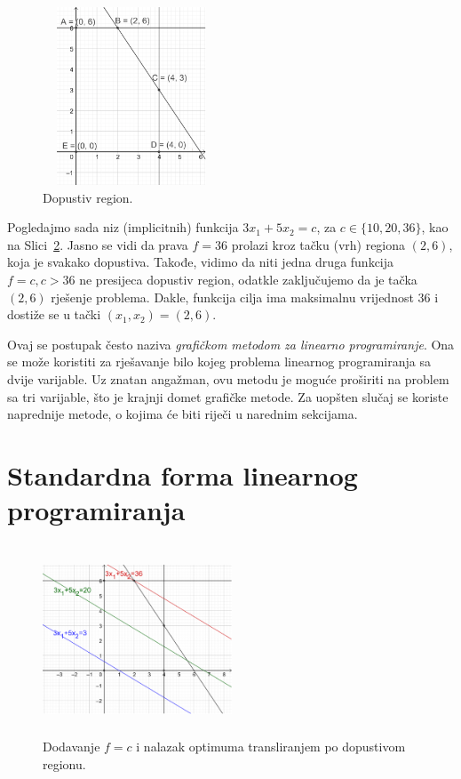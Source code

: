 \documentclass[a4paper, utf8, 11pt, colorlinks]{book}
\begin{document}
\begin{figure}
    \centering
    \includegraphics[width=150pt,height=150pt]{fig1.eps}
    \caption{Dopustiv region.}
    \label{fig:fig1}
\end{figure}
Pogledajmo sada niz (implicitnih) funkcija $3x_1 + 5 x_2 = c$, za $c \in \{10,20, 36\}$, kao na Slici~\ref{fig:fig2}. Jasno se vidi da prava $f = 36$ prolazi kroz tačku (vrh) regiona $(2,6)$, koja je svakako dopustiva. Takođe, vidimo da niti jedna druga funkcija $f=c, c > 36$ ne presijeca dopustiv region, odatkle zaključujemo da je tačka $(2, 6)$ rješenje problema. Dakle, funkcija cilja ima maksimalnu vrijednost 36 i dostiže se u tački $(x_1, x_2)=(2,6)$.

Ovaj se postupak često naziva \emph{grafičkom metodom za linearno programiranje}. Ona se može koristiti za rješavanje bilo kojeg problema linearnog programiranja sa dvije varijable. Uz znatan angažman,  ovu metodu je moguće   proširiti na problem sa tri varijable, što je krajnji domet grafičke metode. Za uopšten slučaj se koriste naprednije metode,  o kojima će biti riječi u narednim sekcijama.

\section{Standardna forma linearnog programiranja}

\begin{figure}[!ht]
    \centering
    \includegraphics[width=160pt, height=160pt]{fig2.eps}
    \caption{Dodavanje $f = c$ i nalazak optimuma transliranjem po dopustivom regionu.}
    \label{fig:fig2}
\end{figure}
\end{document}
